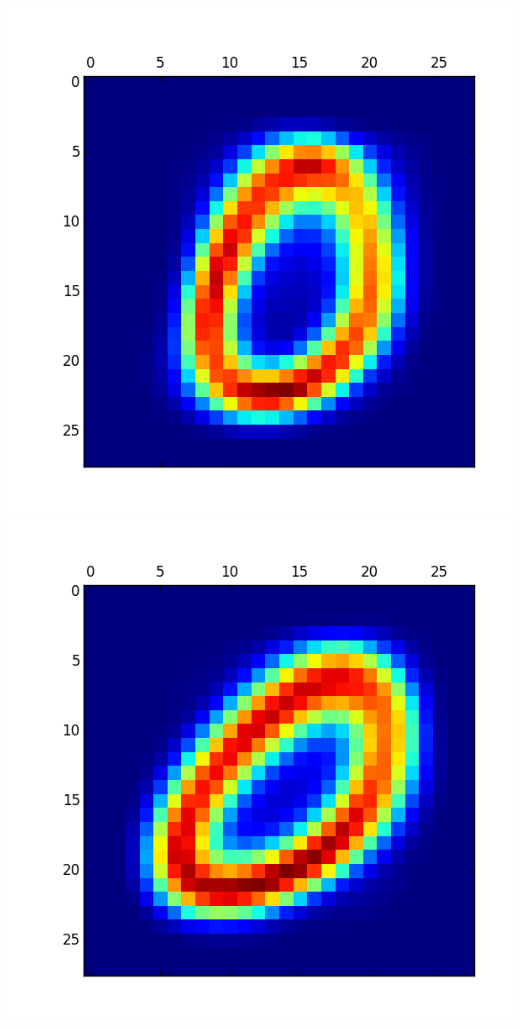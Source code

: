 \documentclass[11pt]{article}
\begin{document}
\begin{itemize}
\includegraphics[scale = 0.5]{20.png}
\includegraphics[scale = 0.5]{21.png}


\end{itemize}
\end{document}
